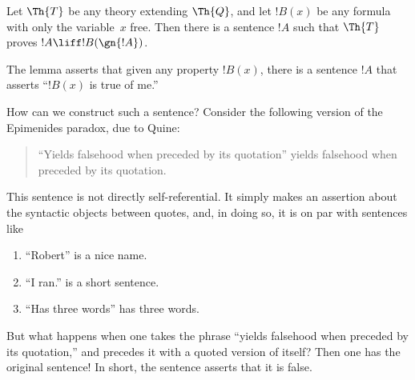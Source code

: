 \documentclass[../../../include/open-logic-section]{subfiles}
\begin{document}
\begin{lem}
Let $\Th{T}$ be any theory extending $\Th{Q}$, and let $!B(x)$ be any
formula with only the variable~$x$ free. Then there is a sentence $!A$
such that $\Th{T}$ proves $!A \liff !B(\gn{!A})$.
\end{lem}

The lemma asserts that given any property $!B(x)$, there is a
sentence $!A$ that asserts ``$!B(x)$ is true of me.''

How can we construct such a sentence? Consider the following version
of the Epimenides paradox, due to Quine:
\begin{quote}
``Yields falsehood when preceded by its quotation'' yields falsehood
when preceded by its quotation.
\end{quote}
This sentence is not directly self-referential. It simply makes an
assertion about the syntactic objects between quotes, and, in doing
so, it is on par with sentences like
\begin{enumerate}
\item ``Robert'' is a nice name.
\item ``I ran.'' is a short sentence.
\item ``Has three words'' has three words.
\end{enumerate}
But what happens when one takes the phrase ``yields falsehood when
preceded by its quotation,'' and precedes it with a quoted version of
itself? Then one has the original sentence!{} In short, the sentence
asserts that it is false.
\end{document}
